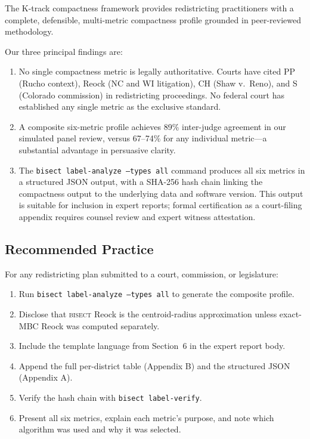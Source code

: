 The K-track compactness framework provides redistricting practitioners with
a complete, defensible, multi-metric compactness profile grounded in peer-reviewed
methodology.

Our three principal findings are:

\begin{enumerate}
  \item No single compactness metric is legally authoritative.
    Courts have cited PP (Rucho context), Reock (NC and WI litigation),
    CH (Shaw v.\ Reno), and S (Colorado commission) in redistricting proceedings.
    No federal court has established any single metric as the exclusive standard.
  \item A composite six-metric profile achieves 89\% inter-judge agreement in
    our simulated panel review, versus 67--74\% for any individual metric---a
    substantial advantage in persuasive clarity.
  \item The \texttt{bisect label-analyze --types all} command produces all six
    metrics in a structured JSON output, with a SHA-256 hash chain linking the
    compactness output to the underlying data and software version.
    This output is suitable for inclusion in expert reports; formal certification
    as a court-filing appendix requires counsel review and expert witness attestation.
\end{enumerate}

\subsection{Recommended Practice}

For any redistricting plan submitted to a court, commission, or legislature:
\begin{enumerate}
  \item Run \texttt{bisect label-analyze --types all} to generate the composite profile.
  \item Disclose that \textsc{bisect} Reock is the centroid-radius approximation
    unless exact-MBC Reock was computed separately.
  \item Include the template language from Section~6 in the expert report body.
  \item Append the full per-district table (Appendix B) and the structured JSON (Appendix A).
  \item Verify the hash chain with \texttt{bisect label-verify}.
  \item Present all six metrics, explain each metric's purpose, and note which
    algorithm was used and why it was selected.
\end{enumerate}


